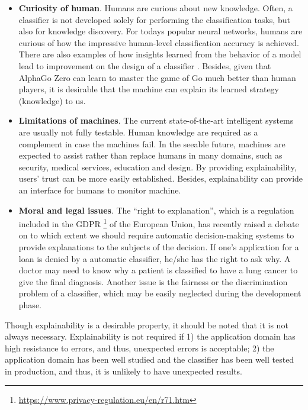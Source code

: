 \begin{itemize}
  \item \textbf{Curiosity of human}. Humans are curious about new knowledge. %
  Often, a classifier is not developed solely for performing the classification tasks, but also for knowledge discovery. For todays popular neural networks, humans are curious of how the impressive human-level classification accuracy is achieved. There are also examples of how insights learned from the behavior of a model lead to improvement on the design of a classifier \cite{zeiler2014eccv, alsallakh2017cnn-hierarchy}. Besides, given that AlphaGo Zero \cite{silver2017mastering} can learn to master the game of Go much better than human players, it is desirable that the machine can explain its learned strategy (knowledge) to us.
  \item \textbf{Limitations of machines}. The current state-of-the-art intelligent systems are usually not fully testable. Human knowledge are required as a complement in case the machines fail. In the seeable future, machines are expected to assist rather than replace humans in many domains, such as security, medical services, education and design. By providing explainability, users' trust can be more easily established. Besides, explainability can provide an interface for humans to monitor machine.
  \item \textbf{Moral and legal issues}. The ``right to explanation'', which is a regulation included in the GDPR \footnote{\url{https://www.privacy-regulation.eu/en/r71.htm}} of the European Union, has recently raised a debate on to which extent we should require automatic decision-making systems to provide explanations to the subjects of the decision. If one's application for a loan is denied by a automatic classifier, he/she has the right to ask why. A doctor may need to know why a patient is classified to have a lung cancer to give the final diagnosis. Another issue is the fairness or the discrimination problem of a classifier, which may be easily neglected during the development phase.
\end{itemize}

Though explainability is a desirable property, it should be noted that it is not always necessary. Explainability is not required if 1) the application domain has high resistance to errors, and thus, unexpected errors is acceptable; 2) the application domain has been well studied and the classifier has been well tested in production, and thus, it is unlikely to have unexpected results.

\newpage